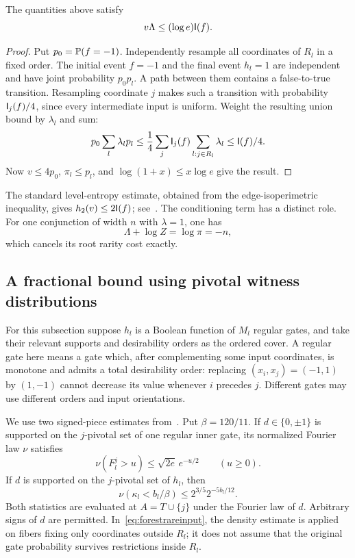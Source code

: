 \begin{lemma}\label{lem:forestpath}
The quantities above satisfy
\[
 v\Lambda\le(\log e)\I(f).
\]
\end{lemma}
\begin{proof}
Put $p_0=\P(f=-1)$. Independently resample all coordinates of $R_l$ in a fixed order. The initial event $f=-1$ and the final event $h_l=1$ are independent and have joint probability $p_0p_l$. A path between them contains a false-to-true transition. Resampling coordinate $j$ makes such a transition with probability $\I_j(f)/4$, since every intermediate input is uniform. Weight the resulting union bound by $\lambda_l$ and sum:
\[
 p_0\sum_l\lambda_lp_l
 \le\frac14\sum_j\I_j(f)\sum_{l:j\in R_l}\lambda_l
 \le\I(f)/4.
\]
Now $v\le4p_0$, $\pi_l\le p_l$, and $\log(1+x)\le x\log e$ give the result.
\end{proof}

The standard level-entropy estimate, obtained from the edge-isoperimetric inequality, gives $h_2(v)\le2\I(f)$; see~\cite{OWZ11,Threshold}. The conditioning term has a distinct role. For one conjunction of width $n$ with $\lambda=1$, one has
\[
 \Lambda+\log Z=\log\pi=-n,
\]
which cancels its root rarity cost exactly.

\subsection{A fractional bound using pivotal witness distributions}

For this subsection suppose $h_l$ is a Boolean function of $M_l$ regular gates, and take their relevant supports and desirability orders as the ordered cover. A regular gate here means a gate which, after complementing some input coordinates, is monotone and admits a total desirability order: replacing $(x_i,x_j)=(-1,1)$ by $(1,-1)$ cannot decrease its value whenever $i$ precedes $j$. Different gates may use different orders and input orientations.

We use two signed-piece estimates from~\cite{Threshold}. Put $\beta=120/11$. If $d\in\{0,\pm1\}$ is supported on the $j$-pivotal set of one regular inner gate, its normalized Fourier law $\nu$ satisfies
\begin{equation}\label{eq:forestrankinput}
 \nu(F_l^j>u)\le\sqrt{2e}\,e^{-u/2}\qquad(u\ge0).
\end{equation}
If $d$ is supported on the $j$-pivotal set of $h_l$, then
\begin{equation}\label{eq:forestrareinput}
 \nu(\kappa_l<b_l/\beta)
 \le2^{3/5}2^{-5b_l/12}.
\end{equation}
Both statistics are evaluated at $A=T\cup\{j\}$ under the Fourier law of $d$. Arbitrary signs of $d$ are permitted. In~\eqref{eq:forestrareinput}, the density estimate is applied on fibers fixing only coordinates outside $R_l$; it does not assume that the original gate probability survives restrictions inside $R_l$.


